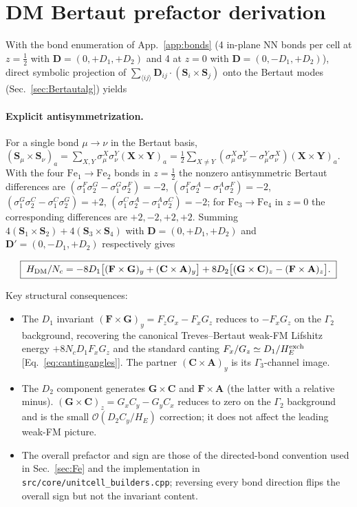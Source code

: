 \documentclass[reprint,amsmath,amssymb,aps,prb,longbibliography]{revtex4-2}
\newcommand{\bfS}{\mathbf{S}}
\newcommand{\bfF}{\mathbf{F}}
\newcommand{\bfG}{\mathbf{G}}
\newcommand{\bfA}{\mathbf{A}}
\newcommand{\bfC}{\mathbf{C}}
\newcommand{\bfX}{\mathbf{X}}
\newcommand{\bfY}{\mathbf{Y}}
\newcommand{\half}{\tfrac{1}{2}}
\begin{document}
\section{DM Bertaut prefactor derivation}
\label{app:DMderivation}

With the bond enumeration of App.~\ref{app:bonds} (4 in-plane NN bonds
per cell at $z=\half$ with $\mathbf D=(0,+D_1,+D_2)$ and 4 at $z=0$
with $\mathbf D=(0,-D_1,+D_2)$), direct symbolic projection of
$\sum_{\langle ij\rangle}\mathbf D_{ij}\cdot(\bfS_i\times\bfS_j)$ onto
the Bertaut modes (Sec.~\ref{sec:Bertautalg}) yields
\paragraph{Explicit antisymmetrization.}
For a single bond $\mu\!\to\!\nu$ in the Bertaut basis,
$(\bfS_\mu\times\bfS_\nu)_a = \sum_{X,Y}\sigma^X_\mu\sigma^Y_\nu(\bfX\times\bfY)_a
= \tfrac12\sum_{X\neq Y}(\sigma^X_\mu\sigma^Y_\nu-\sigma^Y_\mu\sigma^X_\nu)(\bfX\times\bfY)_a$.
With the four $\mathrm{Fe}_1\!\to\!\mathrm{Fe}_2$ bonds in $z=\half$ the
nonzero antisymmetric Bertaut differences are
$(\sigma^F_1\sigma^G_2-\sigma^G_1\sigma^F_2)=-2$,
$(\sigma^F_1\sigma^A_2-\sigma^A_1\sigma^F_2)=-2$,
$(\sigma^G_1\sigma^C_2-\sigma^C_1\sigma^G_2)=+2$,
$(\sigma^C_1\sigma^A_2-\sigma^A_1\sigma^C_2)=-2$;
for $\mathrm{Fe}_3\!\to\!\mathrm{Fe}_4$ in $z=0$ the corresponding
differences are $+2,-2,+2,+2$. Summing $4(\bfS_1\!\times\!\bfS_2) +
4(\bfS_3\!\times\!\bfS_4)$ with $\mathbf D=(0,+D_1,+D_2)$ and
$\mathbf D'=(0,-D_1,+D_2)$ respectively gives
\begin{widetext}
\begin{equation}
\boxed{\;H_{\rm DM}/N_c
  = -8 D_1\bigl[(\bfF\times\bfG)_y + (\bfC\times\bfA)_y\bigr]
  + 8 D_2\bigl[(\bfG\times\bfC)_z - (\bfF\times\bfA)_z\bigr].\;}
\label{eq:HDMBertautCorrect}
\end{equation}
\end{widetext}
Key structural consequences:
\begin{itemize}[leftmargin=*]
\item The $D_1$ invariant $(\bfF\times\bfG)_y = F_zG_x - F_xG_z$
reduces to $-F_xG_z$ on the $\Gamma_2$ background, recovering the
canonical Treves--Bertaut weak-FM Lifshitz energy $+8N_c D_1 F_x G_z$
and the standard canting $F_x/G_z\simeq D_1/H_E^{\rm exch}$
[Eq.~\eqref{eq:cantingangles}]. The partner $(\bfC\times\bfA)_y$
is its $\Gamma_3$-channel image.
\item The $D_2$ component generates $\bfG\times\bfC$ and $\bfF\times\bfA$
(the latter with a relative minus). $(\bfG\times\bfC)_z = G_xC_y - G_yC_x$
reduces to zero on the $\Gamma_2$ background and is the small
$\mathcal O(D_2 C_y/H_E)$ correction; it does not affect the leading
weak-FM picture.
\item The overall prefactor and sign are those of the directed-bond
convention used in Sec.~\ref{sec:Fe} and the implementation in
\verb|src/core/unitcell_builders.cpp|; reversing every bond direction
flips the overall sign but not the invariant content.
\end{itemize}
\end{document}
